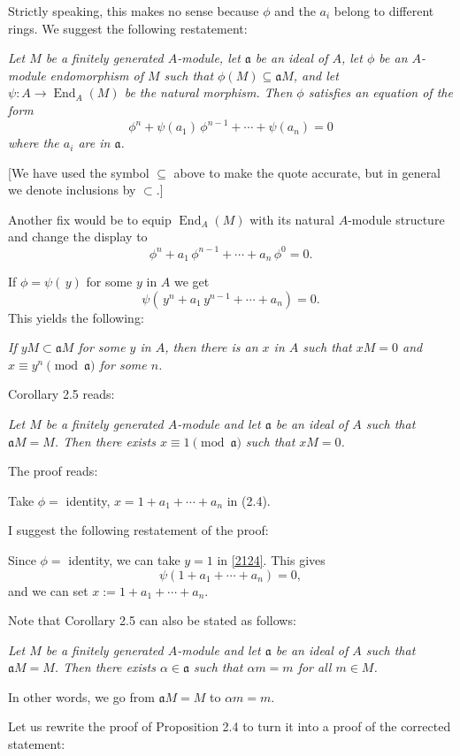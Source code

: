 \documentclass[parskip=half,fontsize=12pt]{scrartcl}%
\newcommand{\oo}{\operatorname}\newcommand{\ooo}{\operatorname*}
\newcommand{\mf}{\mathfrak}
\newcommand{\aaa}{\mf a}
\begin{document}
Strictly speaking, this makes no sense because $\phi$ and the $a_i$ belong to different rings. We suggest the following restatement:

\emph{Let $M$ be a finitely generated $A$-module, let $\aaa$ be an ideal of $A$, let $\phi$ be an $A$-module endomorphism of $M$ such that $\phi(M)\subseteq\aaa M$, and let $\psi:A\to\oo{End}_A(M)$ be the natural morphism. Then $\phi$ satisfies an equation of the form
$$
\phi^n+\psi(a_1)\,\phi^{n-1}+\cdots+\psi(a_n)=0
$$ 
where the $a_i$ are in $\aaa$.}

[We have used the symbol $\subseteq$ above to make the quote accurate, but in general we denote inclusions by $\subset$.]

Another fix would be to equip $\operatorname{End}_A(M)$ with its natural $A$-module structure and change the display to 
$$
\phi^n+a_1\,\phi^{n-1}+\cdots+a_n\,\phi^0=0.
$$

If $\phi=\psi(\,y)$ for some $y$ in $A$ we get 
\begin{equation}\label{2124}
\psi(\,y^n+a_1\,y^{n-1}+\cdots+a_n)=0.
\end{equation}
This yields the following:

\emph{If $yM\subset\aaa M$ for some $y$ in $A$, then there is an $x$ in $A$ such that $xM=0$ and $x\equiv y^n\pmod{\aaa}$ for some $n$.}

Corollary 2.5 reads:

\emph{Let $M$ be a finitely generated $A$-module and let $\aaa$ be an ideal of $A$ such that $\aaa M=M$. Then there exists $x\equiv1\pmod{\aaa}$ such that $xM=0$.}

The proof reads:

Take $\phi=$ identity, $x=1+a_1+\cdots+a_n$ in (2.4).

I suggest the following restatement of the proof:

Since $\phi=$ identity, we can take $y=1$ in \eqref{2124}. This gives 
$$
\psi(1+a_1+\cdots+a_n)=0,
$$ 
and we can set $x:=1+a_1+\cdots+a_n$.

Note that Corollary 2.5 can also be stated as follows:

\emph{Let $M$ be a finitely generated $A$-module and let $\aaa$ be an ideal of $A$ such that $\aaa M=M$. Then there exists $\alpha\in\aaa$ such that $\alpha m=m$ for all $m\in M$.}

In other words, we go from $\aaa M=M$ to $\alpha m=m$.

Let us rewrite the proof of Proposition 2.4 to turn it into a proof of the corrected statement:%
\end{document}
